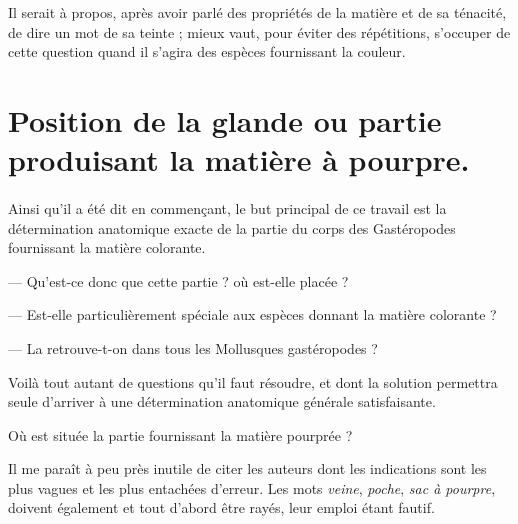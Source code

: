 \documentclass[a4paper, 11pt, oneside, polutonikogreek, french]{article}
\begin{document}
Il serait à propos, après avoir parlé des propriétés de la matière et de sa ténacité, de dire un mot de sa teinte ; mieux vaut, pour éviter des répétitions, s'occuper de cette question quand il s'agira des espèces fournissant la couleur.
\clearpage
\section{Position de la glande ou partie produisant la matière à pourpre.}
\paragraph{}
Ainsi qu'il a été dit en commençant, le but principal de ce travail est la détermination anatomique exacte de la partie du corps des Gastéropodes fournissant la matière colorante.

--- Qu'est-ce donc que cette partie ? où est-elle placée ?

--- Est-elle particulièrement spéciale aux espèces donnant la matière colorante ?

--- La retrouve-t-on dans tous les Mollusques gastéropodes ?

Voilà tout autant de questions qu'il faut résoudre, et dont la solution permettra seule d'arriver à une détermination anatomique générale satisfaisante.

Où est située la partie fournissant la matière pourprée ?

Il me paraît à peu près inutile de citer les auteurs dont les indications sont les plus vagues et les plus entachées d'erreur. Les mots \emph{veine}, \emph{poche}, \emph{sac à pourpre}, doivent également et tout d'abord être rayés, leur emploi étant fautif.
\end{document}
